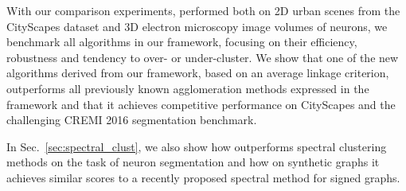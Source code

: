 With our comparison experiments, performed both on 2D urban scenes from the CityScapes dataset and 3D electron microscopy image volumes of neurons, we benchmark all algorithms in our framework, focusing on their efficiency, robustness and tendency to over- or under-cluster.
We show that one of the new algorithms derived from our framework, based on an average linkage criterion, outperforms all previously known agglomeration methods expressed in the framework and that
it achieves competitive performance on CityScapes and the challenging CREMI 2016 segmentation benchmark.

In Sec.~\ref{sec:spectral_clust}, we also show how \algname{} outperforms spectral clustering methods on the task of neuron segmentation and how on synthetic graphs it achieves similar scores to a recently proposed spectral method for signed graphs. 



